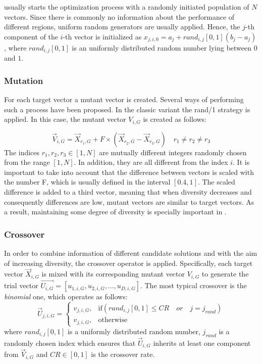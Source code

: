 \DE{} usually starts the optimization process with a randomly initiated population of $N$ vectors.
%
Since there is commonly no information about the performance of different regions, uniform random generators are usually applied.
%
Hence, the $j$-th component of the $i$-th vector is initialized as $x_{j,i,0} = a_{j} + rand_{i,j}[0,1] (b_{j} - a_{j})$,
where $rand_{i,j}[0,1]$ is an uniformly distributed random number lying between $0$ and $1$.

\subsubsection{Mutation}

For each target vector a mutant vector is created.
%
Several ways of performing
such a process have been proposed.
%
In the classic \DE{} variant the rand/1 strategy is applied.
%
In this case, the mutant vector $V_{i,G}$ is created as follows:

\begin{equation}\label{eqn:mutation}
\vec{V}_{i,G} = \vec{X}_{r_1, G} + F \times (\vec{X}_{r_2, G} - \vec{X}_{r_3, G}) \quad r_1 \neq r_2 \neq r_3
\end{equation}
%
The indices $r_1, r_2, r_3 \in [1,N]$ are mutually different integers randomly chosen from the range $[1, N]$.
%
In addition, they are all different from the index $i$.
%
It is important to take into account that the difference between vectors is scaled with the number F, which is usually defined in the interval $[0.4, 1]$.
%
The scaled difference is added to a third vector, meaning that
when diversity decreases and consequently differences are low, mutant vectors are similar to target vectors.
%
As a result, maintaining some degree of diversity is specially important in \DE{}.

\subsubsection{Crossover}

In order to combine information of different candidate solutions and with the aim of increasing diversity, the crossover
operator is applied.
%
Specifically, each target vector $\vec{X}_{i,G}$ is mixed with its corresponding mutant vector $V_{i,G}$ to 
generate the trial vector $\vec{U_{i,G}} = [u_{1,i,G},u_{2,i,G}, ..., u_{D,i,G} ]$.
%
The most typical crossover is the \textit{binomial} one, which operates as follows:
%
\begin{equation} \label{eqn:crossover}
\vec{U}_{j,i,G}= 
\begin{cases}
    v_{j,i,G},& \text{if} (rand_{i,j}[0,1] \leq CR \quad or \quad j = j_{rand}  )\\
    v_{j,i,G},              & \text{otherwise}
\end{cases}
\end{equation}
where $rand_{i,j}[0,1]$ is a uniformly distributed random number,
$j_{rand}$ is a randomly chosen index which ensures that $\vec{U}_{i,G}$ inherits at least one component from $\vec{V}_{i,G}$ and
$CR \in [0,1]$ is the crossover rate.


